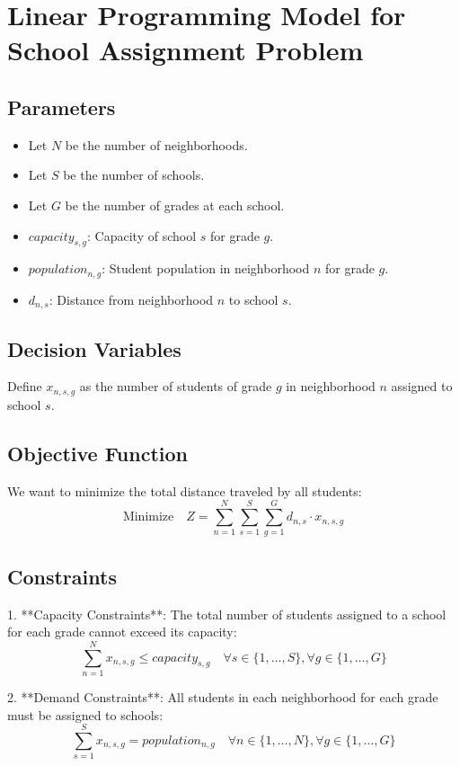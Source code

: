 \documentclass{article}
\begin{document}
\section*{Linear Programming Model for School Assignment Problem}

\subsection*{Parameters}
\begin{itemize}
    \item Let \( N \) be the number of neighborhoods.
    \item Let \( S \) be the number of schools.
    \item Let \( G \) be the number of grades at each school.
    \item \( capacity_{s,g} \): Capacity of school \( s \) for grade \( g \).
    \item \( population_{n,g} \): Student population in neighborhood \( n \) for grade \( g \).
    \item \( d_{n,s} \): Distance from neighborhood \( n \) to school \( s \).
\end{itemize}

\subsection*{Decision Variables}
Define \( x_{n,s,g} \) as the number of students of grade \( g \) in neighborhood \( n \) assigned to school \( s \).

\subsection*{Objective Function}
We want to minimize the total distance traveled by all students:
\[
\text{Minimize} \quad Z = \sum_{n=1}^{N} \sum_{s=1}^{S} \sum_{g=1}^{G} d_{n,s} \cdot x_{n,s,g}
\]

\subsection*{Constraints}

1. **Capacity Constraints**: The total number of students assigned to a school for each grade cannot exceed its capacity:
\[
\sum_{n=1}^{N} x_{n,s,g} \leq capacity_{s,g} \quad \forall s \in \{1, \ldots, S\}, \forall g \in \{1, \ldots, G\}
\]

2. **Demand Constraints**: All students in each neighborhood for each grade must be assigned to schools:
\[
\sum_{s=1}^{S} x_{n,s,g} = population_{n,g} \quad \forall n \in \{1, \ldots, N\}, \forall g \in \{1, \ldots, G\}
\]
\end{document}
